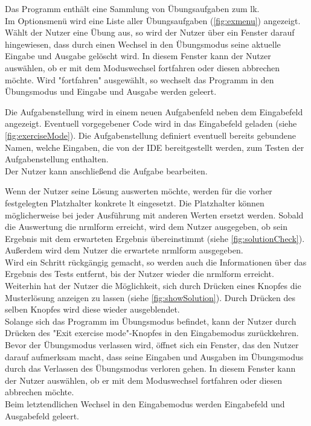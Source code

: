 \documentclass[parskip=full,11pt,twoside]{scrartcl}
\begin{document}
Das Programm enthält eine Sammlung von Übungsaufgaben zum \gls{lk}.\\
Im Optionsmenü wird eine Liste aller Übungsaufgaben (\cref{fig:exmenu}) angezeigt.\\
Wählt der Nutzer eine Übung aus, so wird der Nutzer über ein Fenster darauf hingewiesen, dass durch einen Wechsel in den Übungsmodus seine aktuelle Eingabe und Ausgabe gelöscht wird. In diesem Fenster kann der Nutzer auswählen, ob er mit dem Moduswechsel fortfahren oder diesen abbrechen möchte. Wird "fortfahren" ausgewählt, so wechselt das Programm in den Übungsmodus und Eingabe und Ausgabe werden geleert.

Die Aufgabenstellung wird in einem neuen Aufgabenfeld neben dem Eingabefeld angezeigt. 
Eventuell vorgegebener Code wird in das Eingabefeld geladen (siehe \cref{fig:exerciseMode}).
Die Aufgabenstellung definiert eventuell bereits gebundene Namen, welche Eingaben, die von der IDE bereitgestellt werden, zum Testen der Aufgabenstellung enthalten.\\
Der Nutzer kann anschließend die Aufgabe bearbeiten.
 
Wenn der Nutzer seine Lösung auswerten möchte, werden für die vorher festgelegten Platzhalter konkrete \gls{lt} eingesetzt. Die Platzhalter können möglicherweise bei jeder Ausführung mit anderen Werten ersetzt werden.
Sobald die Auswertung die \gls{nrmlform} erreicht, wird dem Nutzer ausgegeben, ob sein Ergebnis mit dem erwarteten Ergebnis übereinstimmt (siehe \cref{fig:solutionCheck}). Außerdem wird dem Nutzer die erwartete \gls{nrmlform} ausgegeben.\\
Wird ein Schritt rückgängig gemacht, so werden auch die Informationen über das Ergebnis des Tests entfernt, bis der Nutzer wieder die \gls{nrmlform} erreicht. \\
Weiterhin hat der Nutzer die Möglichkeit, sich durch Drücken eines Knopfes die Musterlösung anzeigen zu lassen (siehe \cref{fig:showSolution}). Durch Drücken des selben Knopfes wird diese wieder ausgeblendet. \\

Solange sich das Programm im Übungsmodus befindet, kann der Nutzer durch Drücken des "Exit exercise mode"-Knopfes in den Eingabemodus zurückkehren.\\
Bevor der Übungsmodus verlassen wird, öffnet sich ein Fenster, das den Nutzer darauf aufmerksam macht, dass seine Eingaben und Ausgaben im Übungsmodus durch das Verlassen des Übungsmodus verloren gehen. In diesem Fenster kann der Nutzer auswählen, ob er mit dem Moduswechsel fortfahren oder diesen abbrechen möchte. \\
Beim letztendlichen Wechsel in den Eingabemodus werden Eingabefeld und Ausgabefeld geleert.
\end{document}
